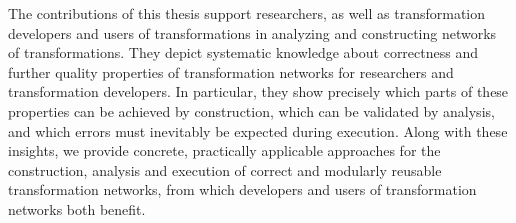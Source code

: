 The contributions of this thesis support researchers, as well as transformation developers and users of transformations in analyzing and constructing networks of transformations.
They depict systematic knowledge about correctness and further quality properties of transformation networks for researchers and transformation developers.
In particular, they show precisely which parts of these properties can be achieved by construction, which can be validated by analysis, and which errors must inevitably be expected during execution. 
Along with these insights, we provide concrete, practically applicable approaches for the construction, analysis and execution of correct and modularly reusable transformation networks, from which developers and users of transformation networks both benefit.
